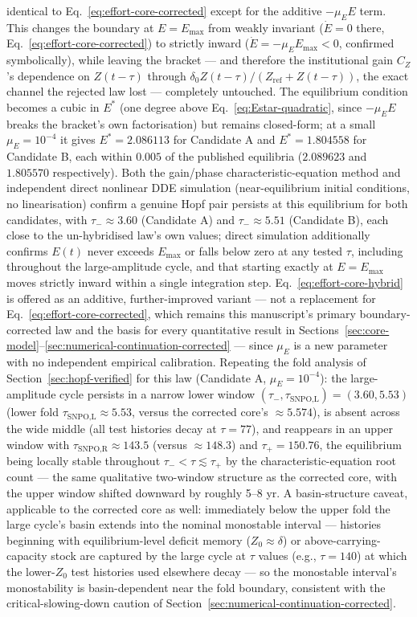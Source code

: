 \documentclass[twocolumn,10pt]{article}
\begin{document}
identical to Eq.~\eqref{eq:effort-core-corrected} except for the additive $-\mu_EE$ term. This changes the boundary at $E=E_{\max}$ from weakly invariant ($\dot E=0$ there, Eq.~\eqref{eq:effort-core-corrected}) to strictly inward ($\dot E=-\mu_EE_{\max}<0$, confirmed symbolically), while leaving the bracket --- and therefore the institutional gain $C_Z$'s dependence on $Z(t-\tau)$ through $\delta_0Z(t-\tau)/(Z_{\text{ref}}+Z(t-\tau))$, the exact channel the rejected law lost --- completely untouched. The equilibrium condition becomes a cubic in $E^*$ (one degree above Eq.~\eqref{eq:Estar-quadratic}, since $-\mu_EE$ breaks the bracket's own factorisation) but remains closed-form; at a small $\mu_E=10^{-4}$ it gives $E^*=2.086113$ for Candidate A and $E^*=1.804558$ for Candidate B, each within $0.005$ of the published equilibria ($2.089623$ and $1.805570$ respectively). Both the gain/phase characteristic-equation method and independent direct nonlinear DDE simulation (near-equilibrium initial conditions, no linearisation) confirm a genuine Hopf pair persists at this equilibrium for both candidates, with $\tau_-\approx3.60$ (Candidate A) and $\tau_-\approx5.51$ (Candidate B), each close to the un-hybridised law's own values; direct simulation additionally confirms $E(t)$ never exceeds $E_{\max}$ or falls below zero at any tested $\tau$, including throughout the large-amplitude cycle, and that starting exactly at $E=E_{\max}$ moves strictly inward within a single integration step. Eq.~\eqref{eq:effort-core-hybrid} is offered as an additive, further-improved variant --- not a replacement for Eq.~\eqref{eq:effort-core-corrected}, which remains this manuscript's primary boundary-corrected law and the basis for every quantitative result in Sections~\ref{sec:core-model}--\ref{sec:numerical-continuation-corrected} --- since $\mu_E$ is a new parameter with no independent empirical calibration. Repeating the fold analysis of Section~\ref{sec:hopf-verified} for this law (Candidate A, $\mu_E=10^{-4}$): the large-amplitude cycle persists in a narrow lower window $(\tau_-,\tau_{\text{SNPO,L}})=(3.60,5.53)$ (lower fold $\tau_{\text{SNPO,L}}\approx5.53$, versus the corrected core's $\approx5.574$), is absent across the wide middle (all test histories decay at $\tau=77$), and reappears in an upper window with $\tau_{\text{SNPO,R}}\approx143.5$ (versus $\approx148.3$) and $\tau_+=150.76$, the equilibrium being locally stable throughout $\tau_-<\tau\lesssim\tau_+$ by the characteristic-equation root count --- the same qualitative two-window structure as the corrected core, with the upper window shifted downward by roughly 5--8 yr. A basin-structure caveat, applicable to the corrected core as well: immediately below the upper fold the large cycle's basin extends into the nominal monostable interval --- histories beginning with equilibrium-level deficit memory ($Z_0\approx\delta$) or above-carrying-capacity stock are captured by the large cycle at $\tau$ values (e.g., $\tau=140$) at which the lower-$Z_0$ test histories used elsewhere decay --- so the monostable interval's monostability is basin-dependent near the fold boundary, consistent with the critical-slowing-down caution of Section~\ref{sec:numerical-continuation-corrected}.
\end{document}
